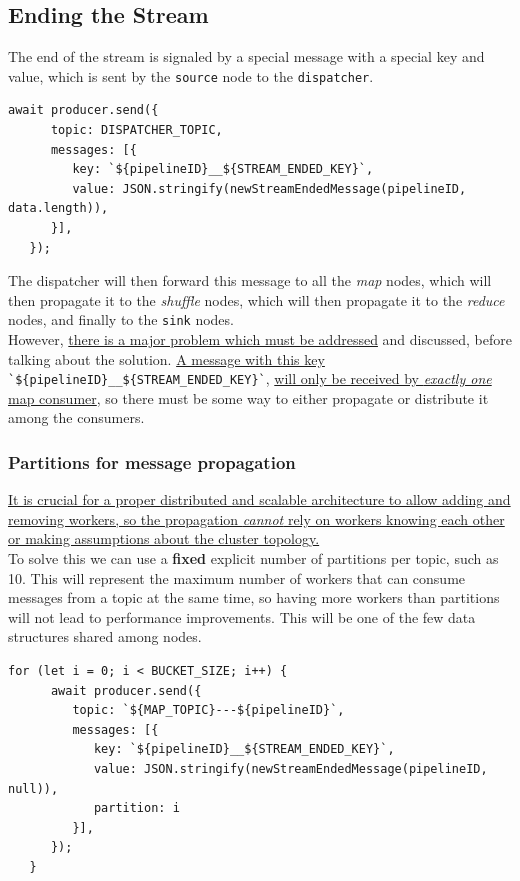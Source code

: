 \subsection{Ending the Stream}
The end of the stream is signaled by a special message with a special key and value, which is sent by the \texttt{source} node to the \texttt{dispatcher}.
\begin{lstlisting}[label={lst:streamEndedSource},caption={Sending STREAM\_ENDED message from source to dispatcher},captionpos={top}]
   await producer.send({
      topic: DISPATCHER_TOPIC,
      messages: [{
         key: `${pipelineID}__${STREAM_ENDED_KEY}`,
         value: JSON.stringify(newStreamEndedMessage(pipelineID, data.length)),
      }],
   });
\end{lstlisting}
 
The dispatcher will then forward this message to all the \textit{map} nodes, which will then propagate it to the \textit{shuffle} nodes, which will then propagate it to the \textit{reduce} nodes, and finally to the \texttt{sink} nodes.\\
However, \ul{there is a major problem which must be addressed} and discussed, before talking about the solution. \ul{A message with this key} \verb|`${pipelineID}__${STREAM_ENDED_KEY}`|, \ul{will only be received by \textit{exactly one} map consumer}, so there must be some way to either propagate or distribute it among the consumers.

\subsubsection{Partitions for message propagation}
\ul{It is crucial for a proper distributed and scalable architecture to allow adding and removing workers, so the propagation \textit{cannot} rely on workers knowing each other or making assumptions about the cluster topology.}\\
To solve this we can use a \textbf{fixed} explicit number of partitions per topic, such as 10. This will represent the maximum number of workers that can consume messages from a topic at the same time, so having more workers than partitions will not lead to performance improvements.
This will be one of the few data structures shared among nodes.

\begin{lstlisting}[label={lst:bucketsize},caption={BUCKET\_SIZE represents the number of partitions per topic},captionpos={top}]
   for (let i = 0; i < BUCKET_SIZE; i++) {
      await producer.send({
         topic: `${MAP_TOPIC}---${pipelineID}`,
         messages: [{
            key: `${pipelineID}__${STREAM_ENDED_KEY}`,
            value: JSON.stringify(newStreamEndedMessage(pipelineID, null)),
            partition: i
         }],
      });
   }
\end{lstlisting}

